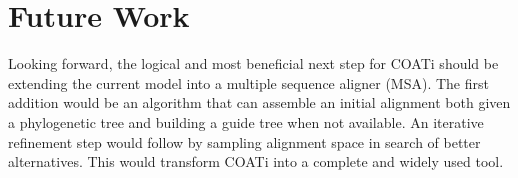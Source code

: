 \section{Future Work}
%
%

Looking forward, the logical and most beneficial next step for COATi should be
extending the current model into a multiple sequence aligner (MSA).
The first addition would be an algorithm that can assemble an initial alignment
both given a phylogenetic tree and building a guide tree when not available.
An iterative refinement step would follow by sampling alignment space in search
of better alternatives.
This would transform COATi into a complete and widely used tool.